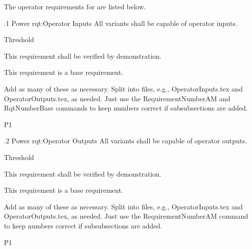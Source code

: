 The operator requirements for \ThisSystem are listed below.

\ONERQMTVKPP
{\RqtNumberBase.1}
{Power}
{rqt:Operator Inputs}
{All \ThisSys variants shall be capable of \TBD operator inputs.}
{
	\item [Phase 1] Threshold
}
{This requirement shall be verified by demonstration.}
{
	\item [N/A] This requirement is a base requirement.
}
{
  \item Add as many of these as necessary. Split into files, e.g., OperatorInputs.tex and OperatorOutputs.tex, as needed. Just use the RequirementNumberAM and RqtNumberBase commands to keep numbers correct if subsubsections are added.
}
{P1}

\ONERQMTVKPP
{\RqtNumberBase.2}
{Power}
{rqt:Operator Outputs}
{All \ThisSys variants shall be capable of \TBD operator outputs.}
{
	\item [Phase 1] Threshold
}
{This requirement shall be verified by demonstration.}
{
	\item [N/A] This requirement is a base requirement.
}
{
  \item Add as many of these as necessary.  Split into files, e.g., OperatorInputs.tex and OperatorOutputs.tex, as needed. Just use the RequirementNumberAM command to keep numbers correct if subsubsections are added.
}
{P1}
